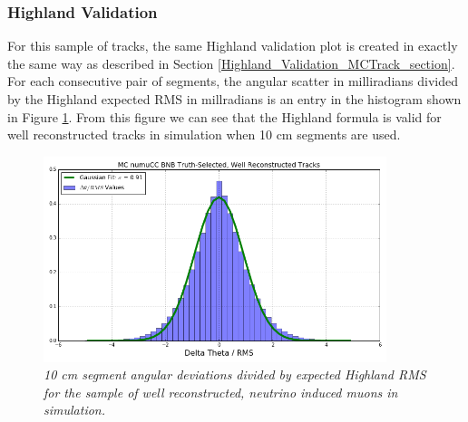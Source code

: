 \subsubsection{Highland Validation}\label{Highland_Validation_MCBNBRecoTrack_section}
For this sample of tracks, the same Highland validation plot is created in exactly the same way as described in Section \ref{Highland_Validation_MCTrack_section}. For each consecutive pair of segments, the angular scatter in milliradians divided by the Highland expected RMS in millradians is an entry in the histogram shown in Figure \ref{Highland_validation_MCBNBRecoTrack_fig}. From this figure we can see that the Highland formula is valid for well reconstructed tracks in simulation when 10 cm segments are used.

\begin{figure}[ht!]
\begin{center}
\includegraphics[width=100mm]{Figures/Highland_validation_MCBNBRecoTrack.png}
\end{center}
\caption{\textit{10 cm segment angular deviations divided by expected Highland RMS for the sample of well reconstructed, neutrino induced muons in simulation.}}
\label{Highland_validation_MCBNBRecoTrack_fig}
\end{figure}




